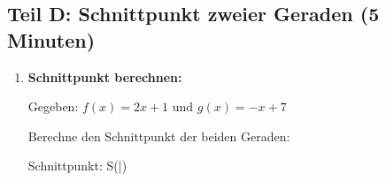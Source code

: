 \subsection*{Teil D: Schnittpunkt zweier Geraden (5 Minuten)}

\begin{enumerate}[label=\arabic*.,resume]

    \item \textbf{Schnittpunkt berechnen:}

    Gegeben: $f(x) = 2x + 1$ und $g(x) = -x + 7$

    Berechne den Schnittpunkt der beiden Geraden:

    \vspace{3cm}

    Schnittpunkt: S(\underline{\hspace{2cm}}|\underline{\hspace{2cm}})

\end{enumerate}